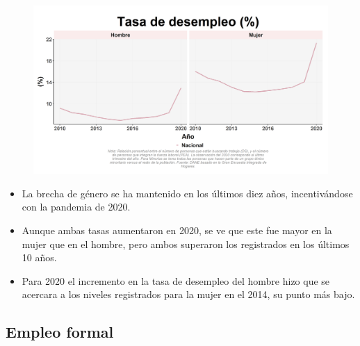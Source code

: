     \begin{figure}[H]
        \caption[Tasa de desempleo por género ]{\label{desemp_gen_trend} }
        \begin{center}
        \includegraphics[width=\textwidth,keepaspectratio]{img/var_49_trend.png}
        \end{center}
    \end{figure}
            \begin{itemize}
                \item La brecha de género se ha mantenido en los últimos diez años, incentivándose con la pandemia de 2020.
                \item Aunque ambas tasas aumentaron en 2020, se ve que este fue mayor en la mujer que en el hombre, pero ambos superaron los registrados en los últimos 10 años.
                \item Para 2020 el incremento en la tasa de desempleo del hombre hizo que se acercara a los niveles registrados para la mujer en el 2014, su punto más bajo.
                \end{itemize}

    \subsection{Empleo formal}

